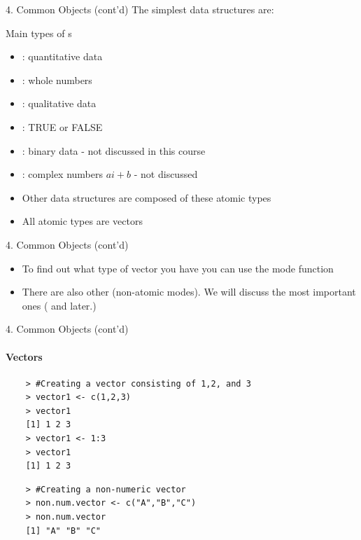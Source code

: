 \documentclass[14pt, aspectratio=169, sectionpage=simple, xclolor=table]{beamer}
\begin{document}
\begin{frame}[fragile]{4. Common \R Objects (cont'd)}
The simplest data structures are:
\begin{block}{Main types of \code{\textcolor{emclblue}{mode}}s}
  	\begin{itemize}
    \item {}: quantitative data
    \item {}: whole numbers 
    \item {}: qualitative data
    \item {}: TRUE or FALSE
    \item {}: binary data - not discussed in this course 
    \item {}: complex numbers $ai +b$ - not discussed
    \nl
  \end{itemize}
\end{block}   
\begin{itemize}
	\item Other data structures are composed of these \alert{atomic types}
  \item All atomic types are \alert{vectors}
 \end{itemize}
\end{frame}

\begin{frame}[fragile]{ 4. Common \R Objects (cont'd)}
  \begin{itemize}
    \item To find out what type of vector you have you can use the \alert{mode} function
    \item There are also other (non-atomic modes). We will discuss the most important ones ( and  later.)
  \end{itemize}
\end{frame}

\begin{frame}[fragile]{4. Common \R Objects (cont'd)}
\vspace*{-6mm}
\framesubtitle{Vectors}
{\small
	\begin{verbatim}
	> #Creating a vector consisting of 1,2, and 3
	> vector1 <- c(1,2,3)
	> vector1
	[1] 1 2 3
	> vector1 <- 1:3
	> vector1
	[1] 1 2 3
	\end{verbatim}
	\begin{verbatim}
	> #Creating a non-numeric vector
	> non.num.vector <- c("A","B","C")
	> non.num.vector
	[1] "A" "B" "C"
	\end{verbatim}
}
\end{frame}
\end{document}
